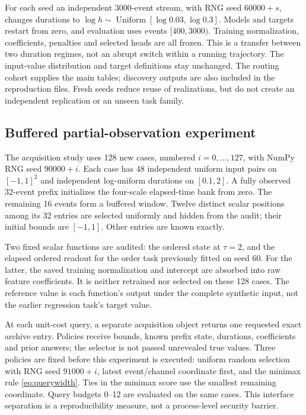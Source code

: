 \documentclass[11pt,a4paper]{article}
\theoremstyle{definition}\newtheorem{definition}[theorem]{Definition}
\begin{document}
For each seed an independent 3000-event stream, with RNG seed $60000+s$, changes durations to $\log h\sim\operatorname{Uniform}[\log0.03,\log0.3]$. Models and targets restart from zero, and evaluation uses events $[400,3000)$. Training normalization, coefficients, penalties and selected heads are all frozen. This is a transfer between two duration regimes, not an abrupt switch within a running trajectory. The input-value distribution and target definitions stay unchanged. The routing cohort supplies the main tables; discovery outputs are also included in the reproduction files. Fresh seeds reduce reuse of realizations, but do not create an independent replication or an unseen task family.

\subsection{Buffered partial-observation experiment}
The acquisition study uses 128 new cases, numbered $i=0,\ldots,127$, with NumPy RNG seed $90000+i$. Each case has 48 independent uniform input pairs on $[-1,1]^2$ and independent log-uniform durations on $[0.1,2]$. A fully observed 32-event prefix initializes the four-scale elapsed-time bank from zero. The remaining 16 events form a buffered window. Twelve distinct scalar positions among its 32 entries are selected uniformly and hidden from the audit; their initial bounds are $[-1,1]$. Other entries are known exactly.

Two fixed scalar functions are audited: the ordered state at $\tau=2$, and the elapsed ordered readout for the order task previously fitted on seed 60. For the latter, the saved training normalization and intercept are absorbed into raw feature coefficients. It is neither retrained nor selected on these 128 cases. The reference value is each function's output under the complete synthetic input, not the earlier regression task's target value.

At each unit-cost query, a separate acquisition object returns one requested exact archive entry. Policies receive bounds, known prefix state, durations, coefficients and prior answers; the selector is not passed unrevealed true values. Three policies are fixed before this experiment is executed: uniform random selection with RNG seed $91000+i$, latest event/channel coordinate first, and the minimax rule \eqref{eq:querywidth}. Ties in the minimax score use the smallest remaining coordinate. Query budgets 0--12 are evaluated on the same cases. This interface separation is a reproducibility measure, not a process-level security barrier.
\end{document}
